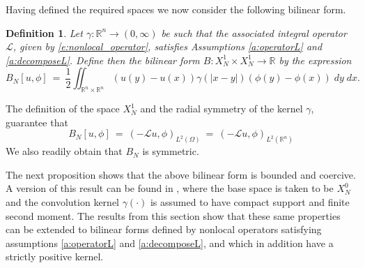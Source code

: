 \documentclass[11pt]{amsart}   	%
\theoremstyle{plain}
\numberwithin{equation}{section}
\newtheorem{definition}[thm]{Definition}
\def\R{\mathbb{R}}
\begin{document}
Having defined the required spaces we now consider the following bilinear form.

\begin{definition}\label{d:bilinearform_N}
Let $\gamma: \R^n \longrightarrow (0,\infty)$ be such that the associated integral operator $\mathcal{L}$, given by 
\eqref{e:nonlocal_operator}, satisfies Assumptions \ref{a:operatorL} and \ref{a:decomposeL}. 
Define then the bilinear form $B: X^1_N \times X^1_N \longrightarrow \R$ by the expression
\[ B_N[u,\phi] \ = \ \frac{1}{2} \iint_{\R^n \times \R^n}  (u(y) - u(x)) \gamma(|x-y|) (\phi(y) -\phi(x)) \;dy\;dx.\]
\end{definition}

The definition of the space $X^1_N$ and  the radial symmetry of the kernel $\gamma$, guarantee that
\begin{equation}\label{Eq:BilinearToL_N}
B_N[u,\phi] \ = \ (-\mathcal{L}u, \phi)_{L^2(\Omega)} \ = \ (-\mathcal{L}u, \phi)_{L^2(\R^n)} 
\end{equation}
We also readily obtain that $B_N$ is symmetric.

The next proposition shows that the above bilinear form is bounded and coercive. A version of this result 
can be found in \cite{cappanera2024analysis}, where the base space is taken to be $X^0_N$ and the convolution kernel $\gamma(\cdot)$ is assumed to have compact support and finite second moment. The results from this section show that these same properties can be extended to bilinear forms defined by nonlocal operators satisfying assumptions \ref{a:operatorL} and \ref{a:decomposeL}, and which in addition have a strictly positive kernel. 
\end{document}
